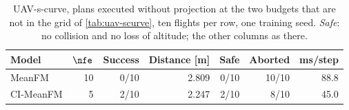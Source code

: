 \begin{table}[htpb]
  \caption[UAV-s-curve: unprojected cells outside the grid]{UAV-s-curve, plans executed without
  projection at the two budgets that are not in the grid of \autoref{tab:uav-scurve}, ten flights per row,
  one training seed. \emph{Safe}: no collision and no loss of altitude; the other columns as there.}
  \label{tab:app:uav-scurve-unprojected-extra}
  \centering
  \small
  \begin{tabularx}{\linewidth}{@{}L r r r r r r@{}}
    \toprule
    Model & $\nfe$ & Success & Distance [m] & Safe & Aborted & ms/step \\
    \midrule
    MeanFM    & 10 & 0/10 & 2.809 & 0/10 & 10/10 & 88.8 \\
    CI-MeanFM & 5  & 2/10 & 2.247 & 2/10 & 8/10  & 45.0 \\
    \bottomrule
  \end{tabularx}
\end{table}

